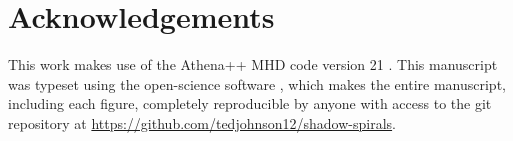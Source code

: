 \documentclass[twocolumn]{aastex631}
\begin{document}
\section{Acknowledgements}
This work makes use of the Athena++ MHD code version 21 \citep{athena++developmentteam2021}.
This manuscript was typeset using the open-science software \showyourwork, which makes the entire manuscript, including each figure,
completely reproducible by anyone with access to the git repository at \url{https://github.com/tedjohnson12/shadow-spirals}.




\end{document}
